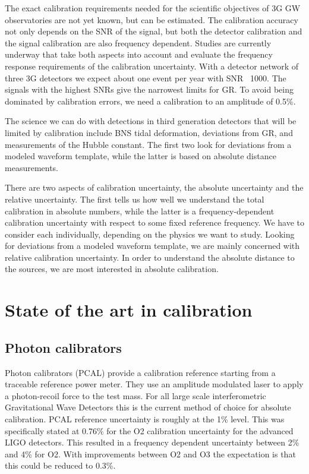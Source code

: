 The exact calibration requirements needed for the scientific objectives of 3G GW observatories are not yet known, but can be estimated. The calibration accuracy not only depends on the SNR of the signal, but both the detector calibration and the signal calibration are also frequency dependent. Studies are currently underway that take both aspects into account and evaluate the frequency response requirements of the calibration uncertainty.  With a detector network of three 3G detectors we expect about one event per year with SNR ~1000. The signals with the highest SNRs give the narrowest limits for GR. To avoid being dominated by calibration errors, we need a calibration  to an amplitude of 0.5\%.

The science we can do with detections in third generation detectors that will be limited by calibration include BNS tidal deformation, deviations from GR, and measurements of the Hubble constant. The first two look for deviations from a modeled waveform template, while the latter is based on absolute distance measurements.

There are two aspects of calibration uncertainty, the absolute uncertainty and the relative uncertainty. The first tells us how well we understand the total calibration in absolute numbers, while the latter is a frequency-dependent calibration uncertainty with respect to some fixed reference frequency. We have to consider each individually, depending on the physics we want to study. Looking for deviations from a modeled waveform template, we are mainly concerned with relative calibration uncertainty. In order to understand the absolute distance to the sources, we are most interested in absolute calibration.

\section{State of the art in calibration}
\subsection{Photon calibrators}
Photon calibrators (PCAL) provide a calibration reference starting from a traceable reference power meter. They use an amplitude modulated laser to apply a photon-recoil force to the test mass. For all large scale interferometric Gravitational Wave Detectors this is the current method of choice for absolute calibration. 
PCAL reference uncertainty is roughly at the 1\% level. This was specifically stated at 0.76\% for the O2 calibration uncertainty for the advanced LIGO detectors. This resulted in a frequency dependent uncertainty between 2\% and 4\% for O2. With improvements between O2 and O3 the expectation is that this could be reduced to  0.3\%. 

